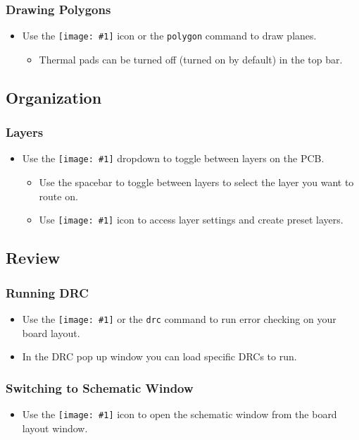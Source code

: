 \documentclass{article}
\newcommand{\icon}[1]{\texttt{[image: \#1]}}
\begin{document}
\subsubsection{Drawing Polygons}
\begin{itemize}
    \item Use the \icon{polygon.png} icon or the \texttt{polygon} command to draw planes.
    \begin{itemize}
        \item Thermal pads can be turned off (turned on by default) in the top bar.
    \end{itemize}
\end{itemize}

\subsection{Organization}
\subsubsection{Layers}
\begin{itemize}
    \item Use the \icon{brdlayer.png} dropdown to toggle between layers on the PCB.
    \begin{itemize}
        \item Use the spacebar to toggle between layers to select the layer you want to route on.
        \item Use \icon{layersettings.png} icon to access layer settings and create preset layers.
    \end{itemize}
\end{itemize}

\subsection{Review}
\subsubsection{Running DRC}
\begin{itemize}
    \item Use the \icon{drc.png} or the \texttt{drc} command to run error checking on your board layout.
    \item In the DRC pop up window you can load specific DRCs to run.
\end{itemize}
\subsubsection{Switching to Schematic Window}
\begin{itemize}
    \item Use the \icon{brdsch.png} icon to open the schematic window from the board layout window.
\end{itemize}
\end{document}
